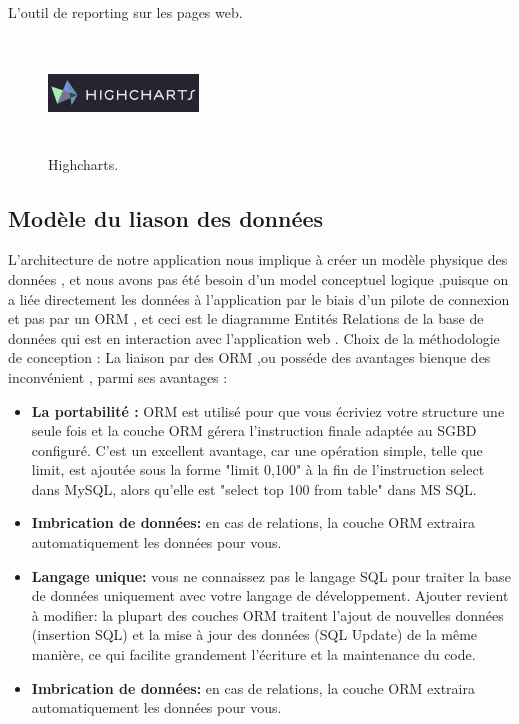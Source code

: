 \begin{itemize}
L'outil de \guillemotleft{} reporting \guillemotright{} sur les pages web.


\begin{figure}[H]
\center
\includegraphics[width=4cm,height=3cm]{./figures/teklogos/highcharts.png}
\caption{Highcharts.}
\end{figure}


\end{itemize} 

\subsection{Mod\`{e}le du liason des donn\'{e}es }
L'architecture de notre application nous implique \`{a} cr\'{e}er un mod\`{e}le physique
des donn\'{e}es , et nous avons pas \'{e}t\'{e} besoin d'un model conceptuel logique
,puisque on a li\'{e}e directement les donn\'{e}es \`{a} l'application par le biais d'un
pilote de connexion et pas par un ORM , et ceci est le diagramme
Entit\'{e}s \textendash{}Relations de la base de donn\'{e}es qui est en interaction avec
l'application web .
Choix de la m\'{e}thodologie de conception :
La liaison par des ORM ,ou poss\'{e}de des avantages bienque des inconv\'{e}nient ,
parmi ses avantages :

\bigskip
\begin{itemize}
\item{\textbf{La portabilit\'{e} :}  ORM est utilis\'{e} pour que vous \'{e}criviez votre structure une
seule fois et la couche ORM g\'{e}rera l'instruction finale adapt\'{e}e au SGBD
configur\'{e}. C'est un excellent avantage, car une op\'{e}ration simple, telle que
limit, est ajout\'{e}e sous la forme "limit 0,100" \`{a} la fin de l'instruction select
dans MySQL, alors qu'elle est "select top 100 from table" dans MS SQL.}

\bigskip
\item{\textbf{Imbrication de donn\'{e}es:} en cas de relations, la couche ORM extraira
automatiquement les donn\'{e}es pour vous.}

\bigskip
\item{\textbf{Langage unique:} vous ne connaissez pas le langage SQL pour traiter la base
de donn\'{e}es uniquement avec votre langage de d\'{e}veloppement.
Ajouter revient \`{a} modifier: la plupart des couches ORM traitent l'ajout de
nouvelles donn\'{e}es (insertion SQL) et la mise \`{a} jour des donn\'{e}es (SQL
Update) de la m\^{e}me mani\`{e}re, ce qui facilite grandement l'\'{e}criture et la
maintenance du code.}

\item{\textbf{Imbrication de donn\'{e}es:} en cas de relations, la couche ORM extraira
automatiquement les donn\'{e}es pour vous.}

\end{itemize}

